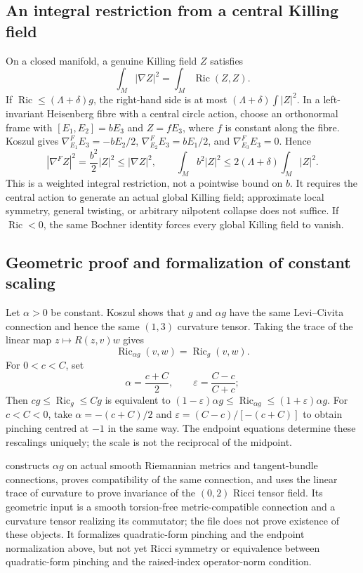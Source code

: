 \documentclass[a4paper,11pt]{article}
\numberwithin{equation}{section}
\theoremstyle{definition}
\newcommand{\Ric}{\operatorname{Ric}}
\begin{document}
\subsection{An integral restriction from a central Killing field}
On a closed manifold, a genuine Killing field $Z$ satisfies
\[
\int_M|\nabla Z|^2=\int_M\Ric(Z,Z).
\]
If $\Ric\le(\Lambda+\delta)g$, the right-hand side is at most
$(\Lambda+\delta)\int|Z|^2$. In a left-invariant Heisenberg fibre with a central circle action, choose an orthonormal frame
with $[E_1,E_2]=bE_3$ and $Z=fE_3$, where $f$ is constant along the fibre. Koszul gives
$\nabla^F_{E_1}E_3=-bE_2/2$,
$\nabla^F_{E_2}E_3=bE_1/2$, and
$\nabla^F_{E_3}E_3=0$. Hence
\[
|\nabla^FZ|^2=\frac{b^2}{2}|Z|^2
\le|\nabla Z|^2,\qquad
\int_Mb^2|Z|^2\le2(\Lambda+\delta)\int_M|Z|^2.
\]
This is a weighted integral restriction, not a pointwise bound on $b$. It requires the central action to generate an actual global Killing field; approximate local symmetry, general twisting, or arbitrary nilpotent collapse does not suffice. If $\Ric<0$, the same Bochner identity forces every global Killing field to vanish.

\subsection{Geometric proof and formalization of constant scaling}
Let $\alpha>0$ be constant. Koszul shows that $g$ and $\alpha g$ have the same Levi--Civita connection and hence the same $(1,3)$ curvature tensor. Taking the trace of
the linear map $z\mapsto R(z,v)w$ gives
\[
\Ric_{\alpha g}(v,w)=\Ric_g(v,w).
\]
For $0<c<C$, set
\[
\alpha=\frac{c+C}{2},\qquad \varepsilon=\frac{C-c}{C+c};
\]
Then $cg\le\Ric_g\le Cg$ is equivalent to
$(1-\varepsilon)\alpha g\le\Ric_{\alpha g}\le(1+\varepsilon)\alpha g$.
For $c<C<0$, take
$\alpha=-(c+C)/2$ and
$\varepsilon=(C-c)/[-(c+C)]$ to obtain pinching centred at $-1$ in the same way.
The endpoint equations determine these rescalings uniquely; the scale is not the reciprocal of the midpoint.

 constructs $\alpha g$ on actual smooth Riemannian metrics and tangent-bundle connections, proves compatibility of the same connection, and uses the linear trace of curvature to prove invariance of the $(0,2)$ Ricci tensor field. Its geometric input is a smooth torsion-free metric-compatible connection and a curvature tensor realizing its commutator; the file does not prove existence of these objects. It formalizes quadratic-form pinching and the endpoint normalization above, but not yet Ricci symmetry or equivalence between quadratic-form pinching and the raised-index operator-norm condition.
\end{document}
